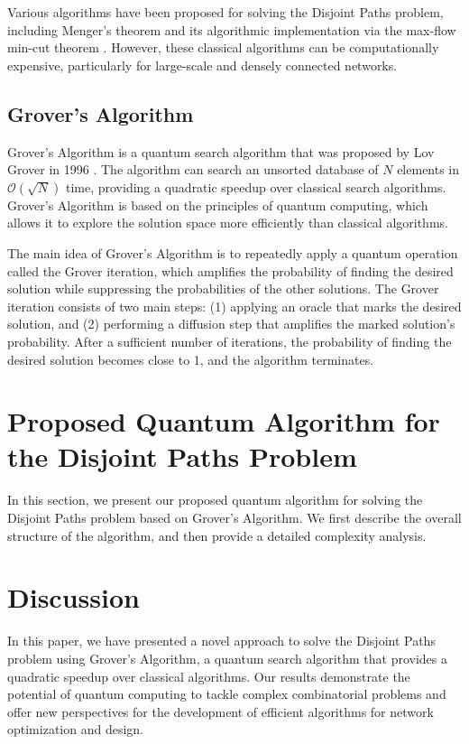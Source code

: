 Various algorithms have been proposed for solving the Disjoint Paths problem, including Menger's theorem \cite{Menger1927} and its algorithmic implementation via the max-flow min-cut theorem \cite{Ford1956}. However, these classical algorithms can be computationally expensive, particularly for large-scale and densely connected networks.

\subsection{Grover's Algorithm}
Grover's Algorithm is a quantum search algorithm that was proposed by Lov Grover in 1996 \cite{Grover1996}. The algorithm can search an unsorted database of $N$ elements in $\mathcal{O}(\sqrt{N})$ time, providing a quadratic speedup over classical search algorithms. Grover's Algorithm is based on the principles of quantum computing, which allows it to explore the solution space more efficiently than classical algorithms.

The main idea of Grover's Algorithm is to repeatedly apply a quantum operation called the Grover iteration, which amplifies the probability of finding the desired solution while suppressing the probabilities of the other solutions. The Grover iteration consists of two main steps: (1) applying an oracle that marks the desired solution, and (2) performing a diffusion step that amplifies the marked solution's probability. After a sufficient number of iterations, the probability of finding the desired solution becomes close to 1, and the algorithm terminates.

\section{Proposed Quantum Algorithm for the Disjoint Paths Problem}
\label{sec:algorithm}
In this section, we present our proposed quantum algorithm for solving the Disjoint Paths problem based on Grover's Algorithm. We first describe the overall structure of the algorithm, and then provide a detailed complexity analysis.


\section{Discussion}
\label{sec:discussion}
In this paper, we have presented a novel approach to solve the Disjoint Paths problem using Grover's Algorithm, a quantum search algorithm that provides a quadratic speedup over classical algorithms. Our results demonstrate the potential of quantum computing to tackle complex combinatorial problems and offer new perspectives for the development of efficient algorithms for network optimization and design.

